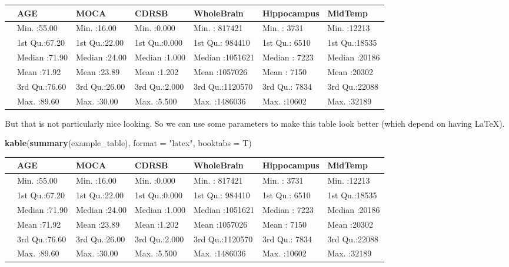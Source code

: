 \documentclass[]{article}
\newenvironment{Shaded}{\begin{snugshade}}{\end{snugshade}}
\newcommand{\DataTypeTok}[1]{\textcolor[rgb]{0.13,0.29,0.53}{#1}}
\newcommand{\KeywordTok}[1]{\textcolor[rgb]{0.13,0.29,0.53}{\textbf{#1}}}
\newcommand{\NormalTok}[1]{#1}
\newcommand{\StringTok}[1]{\textcolor[rgb]{0.31,0.60,0.02}{#1}}
\begin{document}
\begin{tabular}{l|l|l|l|l|l|l}
\hline
  &      AGE &      MOCA &     CDRSB &   WholeBrain &  Hippocampus &    MidTemp\\
\hline
 & Min.   :55.00 & Min.   :16.00 & Min.   :0.000 & Min.   : 817421 & Min.   : 3731 & Min.   :12213\\
\hline
 & 1st Qu.:67.20 & 1st Qu.:22.00 & 1st Qu.:0.000 & 1st Qu.: 984410 & 1st Qu.: 6510 & 1st Qu.:18535\\
\hline
 & Median :71.90 & Median :24.00 & Median :1.000 & Median :1051621 & Median : 7223 & Median :20186\\
\hline
 & Mean   :71.92 & Mean   :23.89 & Mean   :1.202 & Mean   :1057026 & Mean   : 7150 & Mean   :20302\\
\hline
 & 3rd Qu.:76.60 & 3rd Qu.:26.00 & 3rd Qu.:2.000 & 3rd Qu.:1120570 & 3rd Qu.: 7834 & 3rd Qu.:22088\\
\hline
 & Max.   :89.60 & Max.   :30.00 & Max.   :5.500 & Max.   :1486036 & Max.   :10602 & Max.   :32189\\
\hline
\end{tabular}

But that is not particularly nice looking. So we can use some parameters
to make this table look better (which depend on having LaTeX).

\begin{Shaded}
\begin{Highlighting}[]
\KeywordTok{kable}\NormalTok{(}\KeywordTok{summary}\NormalTok{(example_table), }\DataTypeTok{format =} \StringTok{"latex"}\NormalTok{, }\DataTypeTok{booktabs =}\NormalTok{ T)}
\end{Highlighting}
\end{Shaded}

\begin{tabular}{lllllll}
\toprule
  &      AGE &      MOCA &     CDRSB &   WholeBrain &  Hippocampus &    MidTemp\\
\midrule
 & Min.   :55.00 & Min.   :16.00 & Min.   :0.000 & Min.   : 817421 & Min.   : 3731 & Min.   :12213\\
 & 1st Qu.:67.20 & 1st Qu.:22.00 & 1st Qu.:0.000 & 1st Qu.: 984410 & 1st Qu.: 6510 & 1st Qu.:18535\\
 & Median :71.90 & Median :24.00 & Median :1.000 & Median :1051621 & Median : 7223 & Median :20186\\
 & Mean   :71.92 & Mean   :23.89 & Mean   :1.202 & Mean   :1057026 & Mean   : 7150 & Mean   :20302\\
 & 3rd Qu.:76.60 & 3rd Qu.:26.00 & 3rd Qu.:2.000 & 3rd Qu.:1120570 & 3rd Qu.: 7834 & 3rd Qu.:22088\\
\addlinespace
 & Max.   :89.60 & Max.   :30.00 & Max.   :5.500 & Max.   :1486036 & Max.   :10602 & Max.   :32189\\
\bottomrule
\end{tabular}
\end{document}
